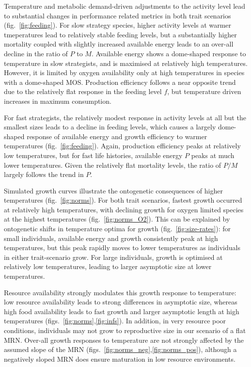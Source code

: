 \documentclass[11pt]{article}\usepackage[]{graphicx}\usepackage[]{color,soul}
\begin{document}
Temperature and metabolic demand-driven adjustments to the activity level lead to substantial changes in performance related metrics in both trait scenarios (fig.~\ref{fig:feeding}). For slow strategy species, higher activity levels at warmer tmeperatures lead to relatively stable feeding levels, but a substantially higher mortality coupled with slightly increased available energy leads to an over-all decline in the ratio of $P$ to $M$. Available energy shows a dome-shaped response to temperature in slow strategists, and is maximised at relatively high temperatures. However, it is limited by oxygen availability only at high temperatures in species with a dome-shaped MOS. Production efficiency follows a near opposite trend due to the relatively flat response in the feeding level $f$, but temperature driven increases in maximum consumption.

For fast strategists, the relatively modest response in activity levels at all but the smallest sizes leads to a decline in feeding levels, which causes a largely dome-shaped response of available energy and growth efficiency to warmer temperatures (fig.~\ref{fig:feeding}). Again, production efficiency peaks at relatively low temperatures, but for fast life histories, available energy $P$ peaks at much lower temperatures. Given the relatively flat mortality levels, the ratio of $P/M$ largely follows the trend in $P$. 

Simulated growth curves illustrate the ontogenetic consequences of higher temperatures (fig.~\ref{fig:norms}). For both trait scenarios, fastest growth occurred at relatively high temperatures, with declining growth for oxygen limited species at the highest temperatures (fig.~\ref{fig:norms_O2}). This can be explained by ontogenetic shifts in temperature optima for growth (fig.~\ref{fig:size-rates}): for small individuals, available energy and growth consistently peak at high temperatures, but this peak rapidly moves to lower temperatures as individuals in either trait-scenario grow. For large individuals, growth is optimised at relatively low temperatures, leading to larger asymptotic size at lower temperatures. 

Resource availability strongly modulates this growth response to temperature: low resource availability leads to strong differences in asymptotic size, whereas high food availability leads to fast growth and larger asymptotic length at high temperatures (figs.~\ref{fig:norms},\ref{fig:infs}). In addition, in very resource poor conditions, individuals may not grow to reproductive size in our scenario of a flat MRN. Over-all growth responses to temperature are not strongly affected by the assumed slope of the MRN (figs.~\ref{fig:norms_neg},\ref{fig:norms_pos}), although a negatively sloped MRN does ensure maturation in low resource environments.
\end{document}
